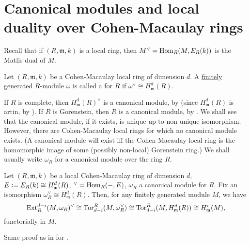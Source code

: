 \documentclass[12pt]{article}
\begin{document}
\section{Canonical modules and local duality over Cohen-Macaulay rings}

Recall that if $(R, \mathfrak{m}, k)$ is a local ring, then $M^{\vee} = \operatorname{Hom}_{R}(M, E_{R}(k))$ is the Matlis dual of $M$. 

\begin{defn}
	Let $(R, \mathfrak{m}, k)$ be a Cohen-Macaulay local ring of dimension $d$. \newline
	A \underline{finitely generated} $R$-module $\omega$ is called a  for $R$ if $\omega^{\vee} \cong H_{\mathfrak{m}}^{d}(R)$.
\end{defn}
If $R$ is complete, then $H_{\mathfrak{m}}^{d}(R)^{\vee}$ is a canonical module, by  (since $H_{\mathfrak{m}}^{d}(R)$ is artin, by ). If $R$ is Gorenstein, then $R$ is a canonical module, by . \newline
We shall see that the canonical module, if it exists, is unique up to non-unique isomorphism. However, there are Cohen-Macaulay local rings for which no canonical module exists. (A canonical module will exist iff the Cohen-Macaulay local ring is the homomorphic image of some (possibly non-local) Gorenstein ring.) \newline
We shall usually write $\omega_{R}$ for a canonical module over the ring $R$.

\begin{thm} \label{thm:local-duality-cohen-macaulay}
	Let $(R, \mathfrak{m}, k)$ be a local Cohen-Macaulay ring of dimension $d$, $E \vcentcolon= E_{R}(k) \cong H_{\mathfrak{m}}^{d}(R)$, $^{\vee} = \operatorname{Hom}_{R}(-, E)$, $\omega_{R}$ a canonical module for $R$. Fix an isomorphism $\omega_{R}^{\vee} \cong H_{\mathfrak{m}}^{d}(R)$. \newline
	Then, for any finitely generated module $M$, we have
	\begin{equation*} 
		\operatorname{Ext}_{R}^{d - i}(M, \omega_{R})^{\vee} \cong \operatorname{Tor}^{R}_{d - i}(M, \omega_{R}^{\vee}) \cong \operatorname{Tor}^{R}_{d - i}(M, H_{\mathfrak{m}}^{d}(R)) \cong H_{\mathfrak{m}}^{i}(M),
	\end{equation*}
	functorially in $M$.
\end{thm}
Same proof as in for . 
\end{document}
